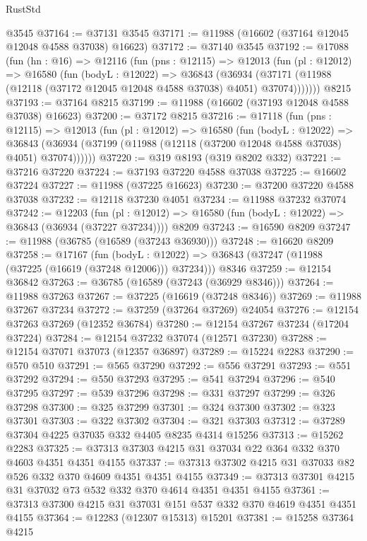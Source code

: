 \begin{lexlean}{RustStd}
\begin{coremodule}
    @3545
@37164 := @37131 @3545
@37171 := @11988 (@16602 (@37164 @12045 @12048 @4588 @37038) @16623)
@37172 := @37140 @3545
@37192 := @17088
    (fun (hn : @16) =>
    @12116
      (fun (pns : @12115) =>
      @12013
        (fun (pl : @12012) =>
        @16580
          (fun (bodyL : @12022) =>
          @36843
            (@36934 (@37171 (@11988 (@12118 (@37172 @12045 @12048 @4588 @37038) @4051) @37074)))))))
    @8215
@37193 := @37164 @8215
@37199 := @11988 (@16602 (@37193 @12048 @4588 @37038) @16623)
@37200 := @37172 @8215
@37216 := @17118
    (fun (pns : @12115) =>
    @12013
      (fun (pl : @12012) =>
      @16580
        (fun (bodyL : @12022) =>
        @36843 (@36934 (@37199 (@11988 (@12118 (@37200 @12048 @4588 @37038) @4051) @37074))))))
@37220 := @319 @8193 (@319 @8202 @332)
@37221 := @37216 @37220
@37224 := @37193 @37220 @4588 @37038
@37225 := @16602 @37224
@37227 := @11988 (@37225 @16623)
@37230 := @37200 @37220 @4588 @37038
@37232 := @12118 @37230 @4051
@37234 := @11988 @37232 @37074
@37242 := @12203
    (fun (pl : @12012) => @16580 (fun (bodyL : @12022) => @36843 (@36934 (@37227 @37234))))
    @8209
@37243 := @16590 @8209
@37247 := @11988 (@36785 (@16589 (@37243 @36930)))
@37248 := @16620 @8209
@37258 := @17167
    (fun (bodyL : @12022) => @36843 (@37247 (@11988 (@37225 (@16619 (@37248 @12006))) @37234)))
    @8346
@37259 := @12154 @36842
@37263 := @36785 (@16589 (@37243 (@36929 @8346)))
@37264 := @11988 @37263
@37267 := @37225 (@16619 (@37248 @8346))
@37269 := @11988 @37267 @37234
@37272 := @37259 (@37264 @37269) @24054
@37276 := @12154 @37263 @37269 (@12352 @36784)
@37280 := @12154 @37267 @37234 (@17204 @37224)
@37284 := @12154 @37232 @37074 (@12571 @37230)
@37288 := @12154 @37071 @37073 (@12357 @36897)
@37289 := @15224 @2283
@37290 := @570 @510
@37291 := @565 @37290
@37292 := @556 @37291
@37293 := @551 @37292
@37294 := @550 @37293
@37295 := @541 @37294
@37296 := @540 @37295
@37297 := @539 @37296
@37298 := @331 @37297
@37299 := @326 @37298
@37300 := @325 @37299
@37301 := @324 @37300
@37302 := @323 @37301
@37303 := @322 @37302
@37304 := @321 @37303
@37312 := @37289 @37304 @4225 @37035 @332 @4405 @8235 @4314 @15256
@37313 := @15262 @2283
@37325 := @37313 @37303 @4215 @31 @37034 @22 @364 @332 @370 @4603 @4351 @4351 @4155
@37337 := @37313 @37302 @4215 @31 @37033 @82 @526 @332 @370 @4609 @4351 @4351 @4155
@37349 := @37313 @37301 @4215 @31 @37032 @73 @532 @332 @370 @4614 @4351 @4351 @4155
@37361 := @37313 @37300 @4215 @31 @37031 @151 @537 @332 @370 @4619 @4351 @4351 @4155
@37364 := @12283 (@12307 @15313) @15201
@37381 := @15258
    @37364
    @4215

\end{coremodule}
\end{lexlean}
